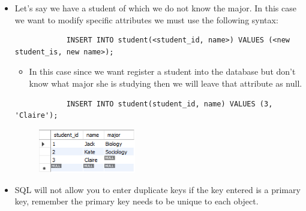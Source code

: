 \begin{itemize}
    \item Let's say we have a student of which we do not know the major. In this case we want to modify specific attributes we must use the following syntax:
        \begin{verbatim}
            INSERT INTO student(<student_id, name>) VALUES (<new student_is, new name>);
        \end{verbatim}
        \begin{itemize}
            \item In this case since we want register a student into the database but don't know what major she is studying then we will leave that attribute as null.
        \end{itemize}
        \begin{verbatim}
            INSERT INTO student(student_id, name) VALUES (3, 'Claire');
        \end{verbatim}
        \begin{figure}[H]
            \centering
            \includegraphics[width=0.4\textwidth]{./figs/insert2.png}
        \end{figure}
    
    \item SQL will not allow you to enter duplicate keys if the key entered is a primary key, remember the primary key needs to be unique to each object.
\end{itemize}

